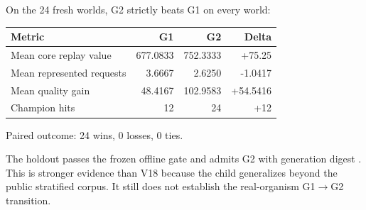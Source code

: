 On the 24 fresh worlds, G2 strictly beats G1 on every world:
\begin{center}
\begin{tabular}{@{}lrrr@{}}
\toprule
Metric & G1 & G2 & Delta \\
\midrule
Mean core replay value & 677.0833 & 752.3333 & +75.25 \\
Mean represented requests & 3.6667 & 2.6250 & -1.0417 \\
Mean quality gain & 48.4167 & 102.9583 & +54.5416 \\
Champion hits & 12 & 24 & +12 \\
\bottomrule
\end{tabular}
\end{center}
Paired outcome: 24 wins, 0 losses, 0 ties.

The holdout passes the frozen offline gate and admits G2 with generation digest . This is stronger evidence than V18 because the child generalizes beyond the public stratified corpus. It still does not establish the real-organism G1$\rightarrow$G2 transition.
